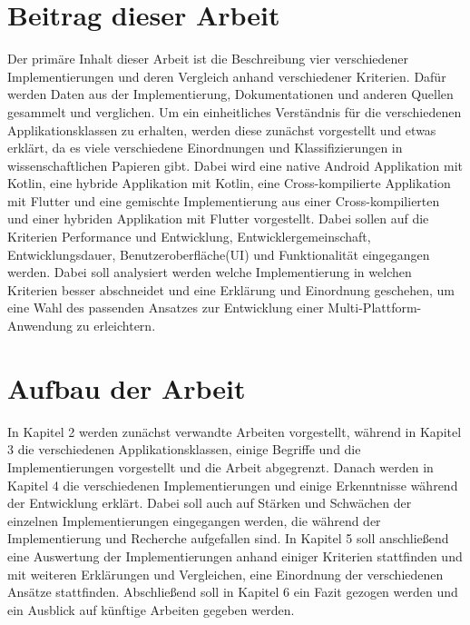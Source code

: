 \section{Beitrag dieser Arbeit}
Der primäre Inhalt dieser Arbeit ist die Beschreibung vier verschiedener Implementierungen und deren Vergleich anhand verschiedener Kriterien. Dafür werden Daten aus der Implementierung, Dokumentationen und anderen Quellen gesammelt und verglichen.
Um ein einheitliches Verständnis für die verschiedenen Applikationsklassen zu erhalten, werden diese zunächst vorgestellt und etwas erklärt, da es viele verschiedene Einordnungen und Klassifizierungen in wissenschaftlichen Papieren gibt.
Dabei wird eine native Android Applikation mit Kotlin, eine hybride Applikation mit Kotlin, eine Cross-kompilierte Applikation mit Flutter und eine gemischte Implementierung aus einer Cross-kompilierten und einer hybriden Applikation mit Flutter vorgestellt. 
Dabei sollen auf die Kriterien Performance und Entwicklung, Entwicklergemeinschaft, Entwicklungsdauer, Benutzeroberfläche(UI) und Funktionalität eingegangen werden. Dabei soll analysiert werden welche Implementierung in welchen Kriterien besser abschneidet und eine Erklärung und Einordnung geschehen, um eine Wahl des passenden Ansatzes zur Entwicklung einer Multi-Plattform-Anwendung zu erleichtern.


\section{Aufbau der Arbeit}
In Kapitel 2 werden zunächst verwandte Arbeiten vorgestellt, während in Kapitel 3 die verschiedenen Applikationsklassen, einige Begriffe und die Implementierungen vorgestellt und die Arbeit abgegrenzt.
Danach werden in Kapitel 4 die verschiedenen Implementierungen und einige Erkenntnisse während der Entwicklung erklärt. Dabei soll auch auf Stärken und Schwächen der einzelnen Implementierungen eingegangen werden, die während der Implementierung und Recherche aufgefallen sind.
In Kapitel 5 soll anschließend eine Auswertung der Implementierungen anhand einiger Kriterien stattfinden und mit weiteren Erklärungen und Vergleichen, eine Einordnung der verschiedenen Ansätze stattfinden. Abschließend soll in Kapitel 6 ein Fazit gezogen werden und ein Ausblick auf künftige Arbeiten gegeben werden.